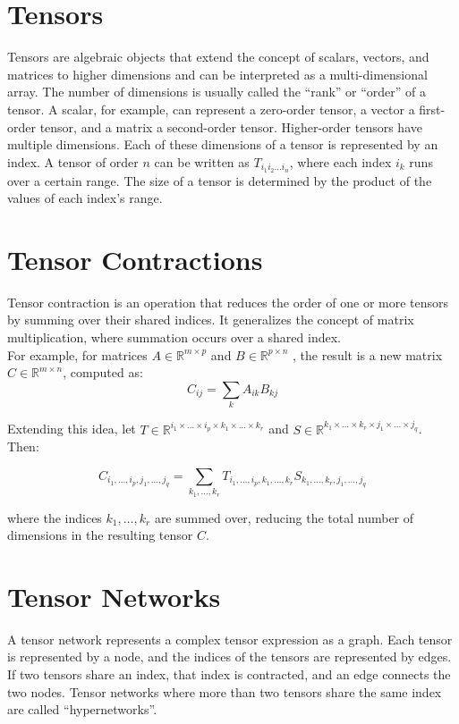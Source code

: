 \section{Tensors}
Tensors are algebraic objects that extend the concept of scalars, vectors, and matrices to higher dimensions and can be interpreted as a multi-dimensional array. The number of dimensions is usually called the ``rank'' or ``order'' of a tensor. A scalar, for example, can represent a zero-order tensor, a vector a first-order tensor, and a matrix a second-order tensor. Higher-order tensors have multiple dimensions. 
Each of these dimensions of a tensor is represented by an index. 
A tensor of order $ n $ can be written as $ T_{i_1 i_2 \dots i_n} $, where each index $ i_k $ runs over a certain range.
The size of a tensor is determined by the product of the values of each index’s range.

\section{Tensor Contractions}
\noindent Tensor contraction is an operation that reduces the order of one or more tensors by summing over their shared indices. It generalizes the concept of matrix multiplication, where summation occurs over a shared index. \\
For example, for matrices $A\in \mathbb{R}^{m\times p}$ and $B\in \mathbb{R}^{p\times n}$ , the result is a new matrix $C\in \mathbb{R}^{m\times n}$, computed as:
$$
C_{ij} = \sum_{k} A_{ik} B_{kj}
$$

\noindent Extending this idea, let $T\in \mathbb{R}^{i_1\times ... \times i_p\times k_1 \times ... \times k_r}$ and $S\in \mathbb{R}^{k_1 \times ... \times k_r\times j_1 \times ... \times j_q}$. Then:

$$
C_{i_1, \dots, i_p, j_1, \dots, j_q} = \sum_{k_1, \dots, k_r} T_{i_1, \dots, i_p, k_1, \dots, k_r} S_{k_1, \dots, k_r, j_1, \dots, j_q}
$$

\noindent where the indices $ k_1, \dots, k_r $ are summed over, reducing the total number of dimensions in the resulting tensor $ C $.

\section{Tensor Networks}
A tensor network represents a complex tensor expression as a graph. Each tensor is represented by a node, and the indices of the tensors are represented by edges. If two tensors share an index, that index is contracted, and an edge connects the two nodes. Tensor networks where more than two tensors share the same index are called ``hypernetworks''. 

